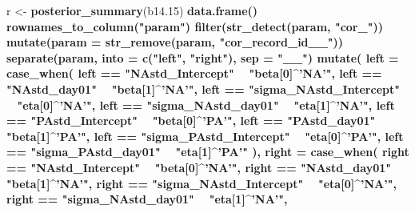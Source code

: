 \documentclass[]{article}
\newenvironment{Shaded}{\begin{snugshade}}{\end{snugshade}}
\newcommand{\DataTypeTok}[1]{\textcolor[rgb]{0.13,0.29,0.53}{#1}}
\newcommand{\FloatTok}[1]{\textcolor[rgb]{0.00,0.00,0.81}{#1}}
\newcommand{\KeywordTok}[1]{\textcolor[rgb]{0.13,0.29,0.53}{\textbf{#1}}}
\newcommand{\NormalTok}[1]{#1}
\newcommand{\OperatorTok}[1]{\textcolor[rgb]{0.81,0.36,0.00}{\textbf{#1}}}
\newcommand{\StringTok}[1]{\textcolor[rgb]{0.31,0.60,0.02}{#1}}
\begin{document}
\begin{Shaded}
\begin{Highlighting}[]
\NormalTok{r <-}
\StringTok{  }\KeywordTok{posterior_summary}\NormalTok{(b14}\FloatTok{.15}\NormalTok{) }\OperatorTok{%>%}\StringTok{ }
\StringTok{  }\KeywordTok{data.frame}\NormalTok{() }\OperatorTok{%>%}\StringTok{ }
\StringTok{  }\KeywordTok{rownames_to_column}\NormalTok{(}\StringTok{"param"}\NormalTok{) }\OperatorTok{%>%}\StringTok{ }
\StringTok{  }\KeywordTok{filter}\NormalTok{(}\KeywordTok{str_detect}\NormalTok{(param, }\StringTok{"cor_"}\NormalTok{)) }\OperatorTok{%>%}\StringTok{ }
\StringTok{  }\KeywordTok{mutate}\NormalTok{(}\DataTypeTok{param =} \KeywordTok{str_remove}\NormalTok{(param, }\StringTok{"cor_record_id__"}\NormalTok{)) }\OperatorTok{%>%}\StringTok{ }
\StringTok{  }\KeywordTok{separate}\NormalTok{(param, }\DataTypeTok{into =} \KeywordTok{c}\NormalTok{(}\StringTok{"left"}\NormalTok{, }\StringTok{"right"}\NormalTok{), }\DataTypeTok{sep =} \StringTok{"__"}\NormalTok{) }\OperatorTok{%>%}\StringTok{ }
\StringTok{  }\KeywordTok{mutate}\NormalTok{(}
    \DataTypeTok{left =} \KeywordTok{case_when}\NormalTok{(}
\NormalTok{      left }\OperatorTok{==}\StringTok{ "NAstd_Intercept"}       \OperatorTok{~}\StringTok{ "beta[0]^'NA'"}\NormalTok{,}
\NormalTok{      left }\OperatorTok{==}\StringTok{ "NAstd_day01"}           \OperatorTok{~}\StringTok{ "beta[1]^'NA'"}\NormalTok{,}
\NormalTok{      left }\OperatorTok{==}\StringTok{ "sigma_NAstd_Intercept"} \OperatorTok{~}\StringTok{ "eta[0]^'NA'"}\NormalTok{,}
\NormalTok{      left }\OperatorTok{==}\StringTok{ "sigma_NAstd_day01"}     \OperatorTok{~}\StringTok{ "eta[1]^'NA'"}\NormalTok{,}
\NormalTok{      left }\OperatorTok{==}\StringTok{ "PAstd_Intercept"}       \OperatorTok{~}\StringTok{ "beta[0]^'PA'"}\NormalTok{,}
\NormalTok{      left }\OperatorTok{==}\StringTok{ "PAstd_day01"}           \OperatorTok{~}\StringTok{ "beta[1]^'PA'"}\NormalTok{,}
\NormalTok{      left }\OperatorTok{==}\StringTok{ "sigma_PAstd_Intercept"} \OperatorTok{~}\StringTok{ "eta[0]^'PA'"}\NormalTok{,}
\NormalTok{      left }\OperatorTok{==}\StringTok{ "sigma_PAstd_day01"}     \OperatorTok{~}\StringTok{ "eta[1]^'PA'"}
\NormalTok{      ),}
    \DataTypeTok{right =} \KeywordTok{case_when}\NormalTok{(}
\NormalTok{      right }\OperatorTok{==}\StringTok{ "NAstd_Intercept"}       \OperatorTok{~}\StringTok{ "beta[0]^'NA'"}\NormalTok{,}
\NormalTok{      right }\OperatorTok{==}\StringTok{ "NAstd_day01"}           \OperatorTok{~}\StringTok{ "beta[1]^'NA'"}\NormalTok{,}
\NormalTok{      right }\OperatorTok{==}\StringTok{ "sigma_NAstd_Intercept"} \OperatorTok{~}\StringTok{ "eta[0]^'NA'"}\NormalTok{,}
\NormalTok{      right }\OperatorTok{==}\StringTok{ "sigma_NAstd_day01"}     \OperatorTok{~}\StringTok{ "eta[1]^'NA'"}\NormalTok{,}
}}}}}}
\end{Highlighting}
\end{Shaded}
\end{document}
